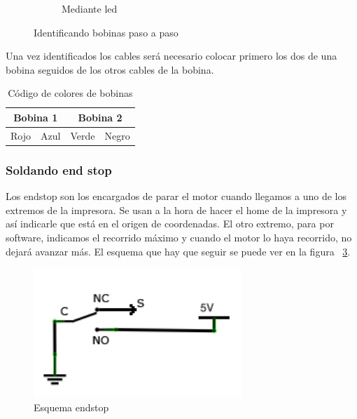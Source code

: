 \begin{figure}[H]
\begin{subfigure}[b]{0.4\textwidth}
				                \caption{Mediante led}
				                \label{fig:led.bobina}
				        \end{subfigure}
				        \caption{Identificando bobinas paso a paso}\label{fig:bobinas}
				\end{figure}
				\newpage{}
				Una vez identificados los cables será necesario colocar primero los dos de una bobina seguidos de los otros cables de la bobina. \\
				\begin{table}[htb]
					\centering
				\begin{tabular}{|c|c|c|c|}
				\hline
				\multicolumn{2}{|c|}{Bobina 1} & \multicolumn{2}{|c|}{Bobina 2} \\
				\hline
					Rojo & Azul & Verde & Negro \\
				\hline
				\end{tabular}
				\caption{Código de colores de bobinas}
				\end{table}
				
		\subsubsection{Soldando end stop}
		Los endstop son los encargados de parar el motor cuando llegamos a uno de los extremos de la impresora. Se usan a la hora de hacer el home de la impresora y así indicarle que está en el origen de coordenadas. El otro extremo, para por software, indicamos el recorrido máximo y cuando el motor lo haya recorrido, no dejará avanzar más. El esquema que hay que seguir se puede ver en la figura ~\ref{fig:esquema.endstop}.
		\begin{figure}[H]
			\centering
			\includegraphics[width=0.7\textwidth]{../../Fotos/25.png}
			\caption{Esquema endstop}
			\label{fig:esquema.endstop}
		\end {figure}


